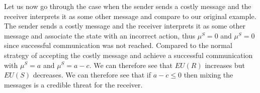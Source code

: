 \documentclass[10]{article}
\begin{document}
Let us now go through the case when the sender sends a costly message and the receiver interprets it as some other message and compare to our original example. The sender sends a costly message and the receiver interprets it as some other message and associate the state with an incorrect action, thus $\mu^S=0$ and $\mu^S=0$ since successful communication was not reached. Compared to the normal strategy of accepting the costly message and achieve a successful communication with $\mu^S=a$ and $\mu^S=a-c$. %
We can therefore see that $EU(R)$ increases but $EU(S)$ decreases. We can therefore see that if $a-c \leq 0$ then mixing the messages is a credible threat for the receiver.
\end{document}
